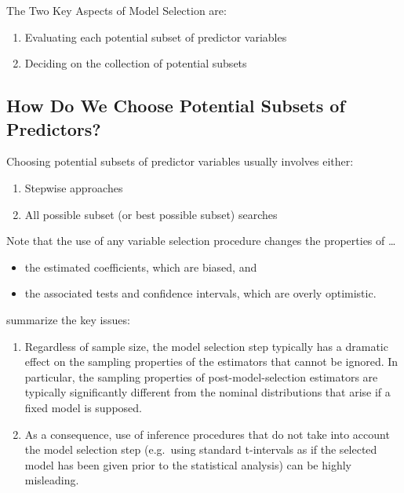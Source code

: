 \documentclass[]{book}
\providecommand{\tightlist}{%
  \setlength{\itemsep}{0pt}\setlength{\parskip}{0pt}}
\theoremstyle{definition}
\theoremstyle{definition}
\theoremstyle{definition}
\theoremstyle{remark}
\begin{document}
The Two Key Aspects of Model Selection are:

\begin{enumerate}
\def\labelenumi{\arabic{enumi}.}
\tightlist
\item
  Evaluating each potential subset of predictor variables
\item
  Deciding on the collection of potential subsets
\end{enumerate}

\subsection{How Do We Choose Potential Subsets of
Predictors?}\label{how-do-we-choose-potential-subsets-of-predictors}

Choosing potential subsets of predictor variables usually involves
either:

\begin{enumerate}
\def\labelenumi{\arabic{enumi}.}
\tightlist
\item
  Stepwise approaches
\item
  All possible subset (or best possible subset) searches
\end{enumerate}

Note that the use of any variable selection procedure changes the
properties of \ldots{}

\begin{itemize}
\tightlist
\item
  the estimated coefficients, which are biased, and
\item
  the associated tests and confidence intervals, which are overly
  optimistic.
\end{itemize}

\citet{Leeb2005} summarize the key issues:

\begin{enumerate}
\def\labelenumi{\arabic{enumi}.}
\tightlist
\item
  Regardless of sample size, the model selection step typically has a
  dramatic effect on the sampling properties of the estimators that
  cannot be ignored. In particular, the sampling properties of
  post-model-selection estimators are typically significantly different
  from the nominal distributions that arise if a fixed model is
  supposed.
\item
  As a consequence, use of inference procedures that do not take into
  account the model selection step (e.g.~using standard t-intervals as
  if the selected model has been given prior to the statistical
  analysis) can be highly misleading.
\end{enumerate}
\end{document}
